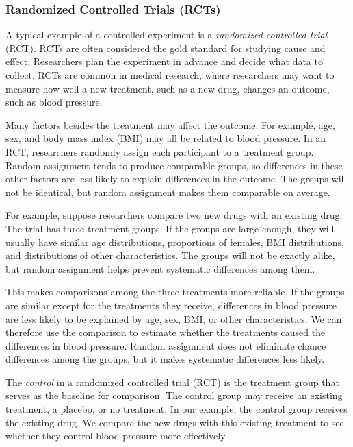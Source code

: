 \subsubsection{Randomized Controlled Trials (RCTs)}

A typical example of a controlled experiment is a \emph{randomized
  controlled trial} (RCT). RCTs are often considered the gold standard for studying
cause and effect. Researchers plan the experiment in advance and
decide what data to collect. RCTs are common in medical research,
where researchers may want to measure how well a new treatment, such
as a new drug, changes an outcome, such as blood pressure.


Many factors besides the treatment may affect the outcome. For
example, age, sex, and body mass index (BMI) may all be related to
blood pressure. In an RCT, researchers randomly assign each
participant to a treatment group. Random assignment tends to produce
comparable groups, so differences in these other factors are less
likely to explain differences in the outcome. The groups will not be
identical, but random assignment makes them comparable on average.


For example, suppose researchers compare two new drugs with an existing
drug. The trial has three treatment groups. If the groups are large
enough, they will
usually have similar age distributions, proportions of females, BMI
distributions, and distributions of other characteristics. The groups
will not be exactly alike, but random assignment helps prevent
systematic differences among them.


This makes comparisons among the three treatments more reliable. If
the groups are similar except for the treatments they receive,
differences in blood pressure are less likely to be explained by age,
sex, BMI, or other characteristics. We can therefore use the
comparison to estimate whether the treatments caused the differences
in blood pressure. Random assignment does not eliminate chance
differences among the groups, but it makes systematic differences less
likely.


The \emph{control} in a randomized controlled trial (RCT)
 is the treatment group
that serves as the baseline for comparison. The control group may receive an
existing treatment, a placebo, or no treatment. In our example, the control
group receives the existing drug. We compare the new drugs with this existing
treatment to see whether they control blood pressure more effectively.

